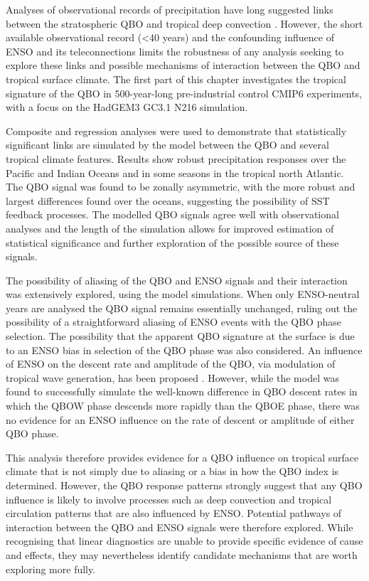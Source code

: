 Analyses of observational records of precipitation have long suggested links between the stratospheric QBO and tropical deep convection \citep{collimore2003,liess2012,gray2018}.
However, the short available observational record (<40 years) and the confounding influence of ENSO and its teleconnections limits the robustness of any analysis seeking to explore these links and possible mechanisms of interaction between the QBO and tropical surface climate. The first part of this chapter investigates the tropical signature of the QBO in 500-year-long pre-industrial control CMIP6 experiments, with a focus on the HadGEM3 GC3.1 N216 simulation. 

Composite and regression analyses were used to demonstrate that statistically significant links are simulated by the model between the QBO and several tropical climate features.
Results show robust precipitation responses over the Pacific and Indian Oceans and in some seasons in the tropical north Atlantic. The QBO signal was found to be zonally asymmetric, with the more robust and largest differences found over the oceans, suggesting the possibility of SST feedback processes. The modelled QBO signals agree well with observational analyses and the length of the simulation allows for improved estimation of statistical significance and further exploration of the possible source of these signals.   

The possibility of aliasing of the QBO and ENSO signals and their interaction was extensively explored, using the model simulations. When only ENSO-neutral years are analysed the QBO signal remains essentially unchanged, ruling out the possibility of a straightforward aliasing of ENSO events with the QBO phase selection. The possibility that the apparent QBO signature at the surface is due to an ENSO bias in selection of the QBO phase was also considered. An influence of ENSO on the descent rate and amplitude of the QBO, via modulation of tropical wave generation, has been proposed \citep{schirber2015}. However, while the model was found to successfully simulate the well-known difference in QBO descent rates in which the QBOW phase descends more rapidly than the QBOE phase, there was no evidence for an ENSO influence on the rate of descent or amplitude of either QBO phase.        

This analysis therefore provides evidence for a QBO influence on tropical surface climate that is not simply due to aliasing or a bias in how the QBO index is determined. However, the QBO response patterns strongly suggest that any QBO influence is likely to involve processes such as deep convection and tropical circulation patterns that are also influenced by ENSO. Potential pathways of interaction between the QBO and ENSO signals were therefore explored. While recognising that linear diagnostics are unable to provide specific evidence of cause and effects, they may nevertheless identify candidate mechanisms that are worth exploring more fully.  

